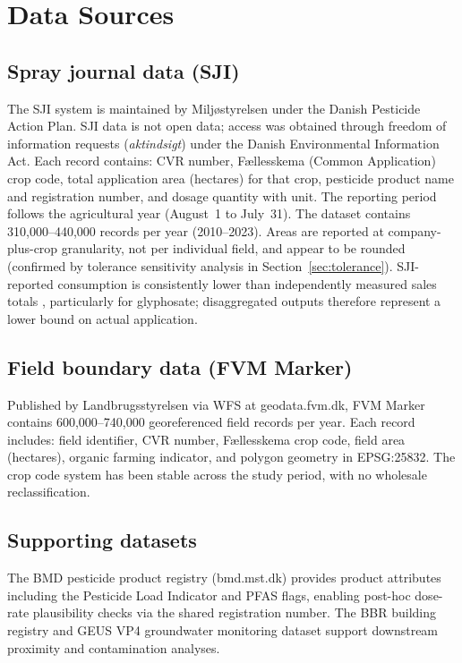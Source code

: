 \documentclass[12pt,a4paper]{article}
\begin{document}
\section{Data Sources}

\subsection{Spray journal data (SJI)}

The SJI system is maintained by Milj\o styrelsen under the Danish Pesticide Action Plan. SJI data is not open data; access was obtained through freedom of information requests (\textit{aktindsigt}) under the Danish Environmental Information Act. Each record contains: CVR number, F\ae llesskema (Common Application) crop code, total application area (hectares) for that crop, pesticide product name and registration number, and dosage quantity with unit. The reporting period follows the agricultural year (August~1 to July~31). The dataset contains 310,000--440,000 records per year (2010--2023). Areas are reported at company-plus-crop granularity, not per individual field, and appear to be rounded (confirmed by tolerance sensitivity analysis in Section~\ref{sec:tolerance}). SJI-reported consumption is consistently lower than independently measured sales totals \cite{mst2023}, particularly for glyphosate; disaggregated outputs therefore represent a lower bound on actual application.

\subsection{Field boundary data (FVM Marker)}

Published by Landbrugsstyrelsen via WFS at geodata.fvm.dk, FVM Marker contains 600,000--740,000 georeferenced field records per year. Each record includes: field identifier, CVR number, F\ae llesskema crop code, field area (hectares), organic farming indicator, and polygon geometry in EPSG:25832. The crop code system has been stable across the study period, with no wholesale reclassification.

\subsection{Supporting datasets}

The BMD pesticide product registry (bmd.mst.dk) provides product attributes including the Pesticide Load Indicator \cite{kudsk2018} and PFAS flags, enabling post-hoc dose-rate plausibility checks via the shared registration number. The BBR building registry and GEUS VP4 groundwater monitoring dataset support downstream proximity and contamination analyses.
\end{document}
